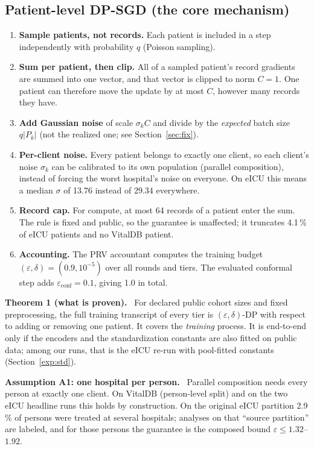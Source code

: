\documentclass[11pt,a4paper]{article}
\newenvironment{keybox}[1]{\par\textbf{#1.}\ }{\par}
\begin{document}
\subsection{Patient-level DP-SGD (the core mechanism)}
\begin{enumerate}
\item \textbf{Sample patients, not records.} Each patient is included in a step
independently with probability $q$ (Poisson sampling).
\item \textbf{Sum per patient, then clip.} All of a sampled patient's record
gradients are summed into one vector, and that vector is clipped to norm
$C = 1$. One patient can therefore move the update by at most $C$, however
many records they have.
\item \textbf{Add Gaussian noise} of scale $\sigma_k C$ and divide by the
\emph{expected} batch size $q|P_k|$ (not the realized one; see
Section~\ref{sec:fix}).
\item \textbf{Per-client noise.} Every patient belongs to exactly one client,
so each client's noise $\sigma_k$ can be calibrated to its own population
(parallel composition), instead of forcing the worst hospital's noise on
everyone. On eICU this means a median $\sigma$ of 13.76 instead of 29.34
everywhere.
\item \textbf{Record cap.} For compute, at most 64 records of a patient enter the
sum. The rule is fixed and public, so the guarantee is unaffected; it truncates
4.1\,\% of eICU patients and no VitalDB patient.
\item \textbf{Accounting.} The PRV accountant computes the training budget
$(\varepsilon, \delta) = (0.9, 10^{-5})$ over all rounds and tiers. The evaluated
conformal step adds $\varepsilon_{\text{conf}} = 0.1$, giving 1.0 in total.
\end{enumerate}

\begin{keybox}{Theorem 1 (what is proven)}
For declared public cohort sizes and fixed preprocessing, the full training
transcript of every tier is $(\varepsilon,\delta)$-DP with respect to adding or
removing one patient. It covers the \emph{training} process. It is end-to-end
only if the encoders and the standardization constants are also fitted on
public data; among our runs, that is the eICU re-run with pool-fitted constants
(Section~\ref{exp:std}).
\end{keybox}

\begin{keybox}{Assumption A1: one hospital per person}
Parallel composition needs every person at exactly one client. On VitalDB
(person-level split) and on the two eICU headline runs this holds by
construction. On the original eICU partition 2.9\,\% of persons were treated at
several hospitals; analyses on that ``source partition'' are labeled, and for those
persons the guarantee is the composed bound $\varepsilon \le 1.32$--$1.92$.
\end{keybox}
\end{document}
